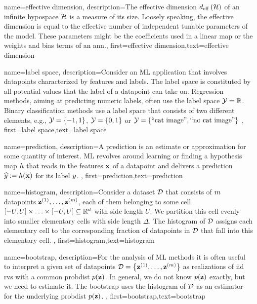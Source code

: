 {name={effective dimension},
	description={The effective dimension $d_{\rm eff} \left( \mathcal{H} \right)$ of 
		an infinite \gls{hypospace} $\mathcal{H}$ is a measure of its size. Loosely speaking, the 
		effective dimension is equal to the effective number of independent tunable parameters 
		of the model. These parameters might be the coefficients used in a linear map or the 
		weights and bias terms of an \gls{ann}.},
	first={effective dimension},text={effective dimension}  
}

{name={label space},
	description={Consider an ML application that involves \gls{datapoint}s characterized by features 
		and labels. The \gls{label} space is constituted by all potential values that the \gls{label} 
		of a \gls{datapoint} can take on. Regression methods, aiming at predicting numeric \gls{label}s, often
		 use the \gls{label} space $\mathcal{Y} = \mathbb{R}$. Binary \gls{classification} methods use a label space 
 		that consists of two different elements, e.g., $\mathcal{Y} =\{-1,1\}$, $\mathcal{Y}=\{0,1\}$ 
		or $\mathcal{Y} = \{ \mbox{``cat image''}, \mbox{``no cat image''} \}$  }, first={label space},text={label space}  
}

{name={prediction},
	description={A prediction is an estimate or approximation for some 
		quantity of interest. ML revolves around learning or finding a \gls{hypothesis} map $h$ 
		that reads in the \gls{feature}s ${\bf x}$ of a \gls{datapoint} and delivers a \gls{prediction} 
		$\widehat{y} := h({\bf x})$ for its \gls{label} $y$. },
	first={prediction},text={prediction}  
}


{name={histogram},
	description={Consider a \gls{dataset} $\mathcal{D}$ that consists of $m$ \gls{datapoint}s 
		${\bf z}^{(1)},\ldots,{\bf z}^{(m)}$, each of them belonging to some 
		cell $[-U,U] \times \ldots \times [-U,U] \subseteq \mathbb{R}^{d}$ with side 
		length $U$. We partition this cell evenly into smaller elementary cells with side 
		length $\Delta$. The histogram of $\mathcal{D}$ assigns each elementary cell to 
		the corresponding fraction of \gls{datapoint}s in $\mathcal{D}$ that fall into this 
		elementary cell. 
	},
	first={histogram},text={histogram}  
}

{name={bootstrap},
	description={For  the analysis of ML methods it is often useful to interpret 
		a given set of \gls{datapoint}s $\mathcal{D} = \big\{ {\bf z}^{(1)},\ldots,{\bf z}^{(m)}\big\}$ 
		as \gls{realization}s of \gls{iid} \gls{rv}s with a common \gls{probdist} $p({\bf z})$. In general, we 
		do not know $p({\bf z})$ exactly, but we need to estimate it. The bootstrap uses the 
		histogram of $\mathcal{D}$ as an estimator for the underlying \gls{probdist} $p({\bf z})$. 
	},
	first={bootstrap},text={bootstrap}  
}

